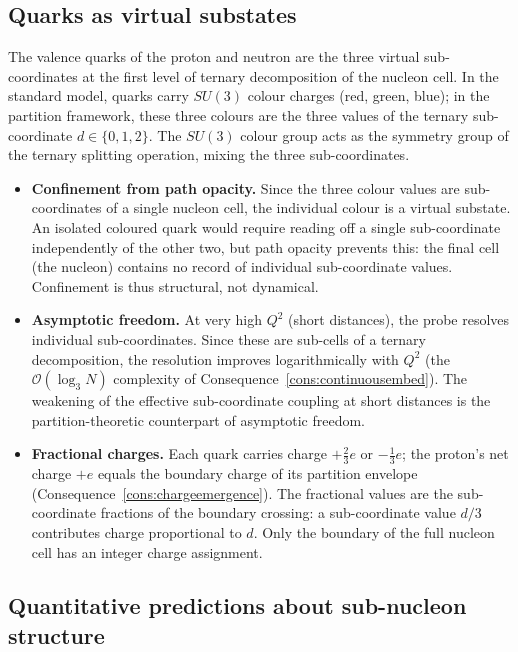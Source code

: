 \subsection{Quarks as virtual substates}
\label{subsec:quarks}

The valence quarks of the proton and neutron are the three virtual sub-coordinates
at the first level of ternary decomposition of the nucleon cell.  In the
standard model, quarks carry $SU(3)$ colour charges (red, green, blue); in the
partition framework, these three colours are the three values of the ternary
sub-coordinate $d\in\{0,1,2\}$.  The $SU(3)$ colour group acts as the symmetry
group of the ternary splitting operation, mixing the three sub-coordinates.

\begin{itemize}
\item \textbf{Confinement from path opacity.}  Since the three colour values are
  sub-coordinates of a single nucleon cell, the individual colour is a virtual
  substate.  An isolated coloured quark would require reading off a single
  sub-coordinate independently of the other two, but path opacity prevents
  this: the final cell (the nucleon) contains no record of individual
  sub-coordinate values.  Confinement is thus structural, not dynamical.

\item \textbf{Asymptotic freedom.}  At very high $Q^{2}$ (short distances), the
  probe resolves individual sub-coordinates.  Since these are sub-cells of a
  ternary decomposition, the resolution improves logarithmically with $Q^{2}$
  (the $\mathcal{O}(\log_{3}N)$ complexity of
  Consequence~\ref{cons:continuousembed}).  The weakening of the effective
  sub-coordinate coupling at short distances is the partition-theoretic
  counterpart of asymptotic freedom.

\item \textbf{Fractional charges.}  Each quark carries charge $+\tfrac{2}{3}e$
  or $-\tfrac{1}{3}e$; the proton's net charge $+e$ equals the boundary charge
  of its partition envelope (Consequence~\ref{cons:chargeemergence}).  The
  fractional values are the sub-coordinate fractions of the boundary crossing:
  a sub-coordinate value $d/3$ contributes charge proportional to $d$.  Only
  the boundary of the full nucleon cell has an integer charge assignment.
\end{itemize}

\subsection{Quantitative predictions about sub-nucleon structure}
\label{subsec:deepinelastic}

